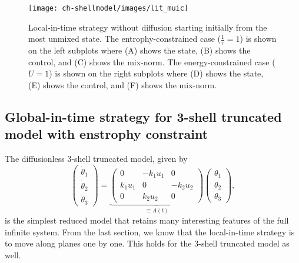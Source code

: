 \begin{figure}[!ht]
	\centering
	\texttt{[image: ch-shellmodel/images/lit\_muic]}
	\caption{Local-in-time strategy without diffusion starting initially from the most unmixed state. The entrophy-constrained case ($\frac{1}{\tau}=1$) is shown on the left subplots where (A) shows the state, (B) shows the control, and (C) shows the mix-norm. The energy-constrained case ($U=1$) is shown on the right subplots where (D) shows the state, (E) shows the control, and (F) shows the mix-norm. }
	\label{fig:lit_muic}
\end{figure}



\subsection{Global-in-time strategy for 3-shell truncated model with enstrophy constraint}
\label{sec:git_enstrophy_3shell}

The diffusionless 3-shell truncated model, given by 
\begin{equation}
	\label{eq:3_mode_state}
	\left(
	\begin{array}{c}
		\dot{\theta}_{1} \\
		\dot{\theta}_{2} \\
		\dot{\theta}_{3}
	\end{array}
	\right)
	=\underbrace{ \left(
		\begin{array}{ccc}
			0          & -k_{1}u_1 & 0         \\
			k_{1}u_{1} & 0         & -k_{2}u_2 \\
			0          & k_{2}u_2  & 0
		\end{array}
		\right)}_{\equiv A(t)}
\left(
\begin{array}{c}
	\theta_{1} \\
	\theta_{2} \\
	\theta_{3}
\end{array}
\right),
\end{equation}
is the simplest reduced model that retains many interesting features of the full infinite system. From the last section, we know that the local-in-time strategy is to move along planes one by one. This holds for the 3-shell truncated model as well. 

